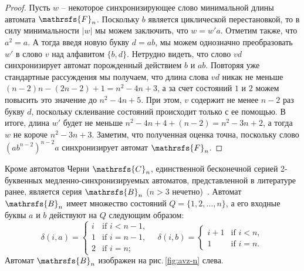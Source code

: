 \documentclass[11pt]{article}
\begin{document}
\begin{proof}
Пусть $w$ -- некоторое синхронизирующее слово минимальной длины автомата $\mathrsfs{F}_n$.
Поскольку $b$ является циклической перестановкой, то в силу минимальности $|w|$ мы можем заключить, что
$w = w'a$. Отметим также, что $a^2 = a$. А тогда введя новую букву $d = ab$,
мы можем однозначно преобразовать $w'$ в слово $v$ над алфавитом $\{b,d\}$.
Нетрудно видеть, что слово $vd$ синхронизирует автомат порожденный действием $b$ и $ab$.
Повторяя уже стандартные рассуждения мы получаем, что длина слова $vd$ никак не меньше $(n - 2)n - (2n - 2) + 1 = n^2 - 4n + 3$,
а за счет состояний $1$ и $2$ можем повысить это значение до $n^2 - 4n + 5$. При этом, $v$ содержит не менее $n - 2$ раз букву $d$,
поскольку склеивание состояний происходит только с ее помощью. В итоге, длина $w'$ будет не меньше $n^2 - 4n + 4 + (n - 2) = n^2 - 3n + 2$,
а тогда $w$ не короче $n^2 - 3n + 3$. Заметим, что полученная оценка точна, поскольку слово $(ab^{n - 2})^{n - 2}a$ 
синхронизирует автомат $\mathrsfs{F}_n$.
\end{proof}


Кроме автоматов Черни $\mathrsfs{C}_n$, единственной бесконечной серией
2-буквенных медленно-синхронизируемых автоматов, 
представленной в литературе ранее, является серия $\mathrsfs{B}_n$ ($n>3$
нечетно)~\cite{AVZ}. Автомат $\mathrsfs{B}_n$ имеет множество состояний 
$Q=\{1,2,\dots,n\}$, а его входные буквы $a$ и $b$ действуют на $Q$ следующим
образом:
$$\delta(i,a)=\begin{cases}
i &\text{if } i<n-1,\\
1 &\text{if } i=n-1,\\
2 &\text{if } i=n;
\end{cases}\quad
\delta(i,b)=\begin{cases}
i+1 &\text{if } i<n,\\
1 &\text{if } i=n.
\end{cases}$$
Автомат $\mathrsfs{B}_n$ изображен на рис.\,\ref{fig:avz-n} слева.
\end{document}
